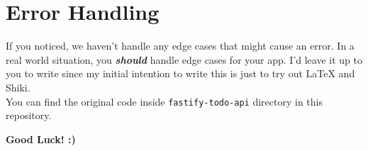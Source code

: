 \documentclass[a4paper,14pt,titlepage]{article}
\def\c#1{\texttt{#1}}
\begin{document}
\section{Error Handling}

If you noticed, we haven't handle any edge cases that might cause an error. In
a real world situation, you \textbf{\textit{should}} handle edge cases for your
app. I'd leave it up to you to write since my initial intention to write this
is just to try out {\LaTeX} and Shiki.\\

You can find the original code inside \c{fastify-todo-api} directory in this
repository.\\[4ex]

\begingroup
  \fontsize{18pt}{20pt}\selectfont
  \begin{center}
    \textbf{Good Luck! :)}
  \end{center}
\endgroup
\end{document}
